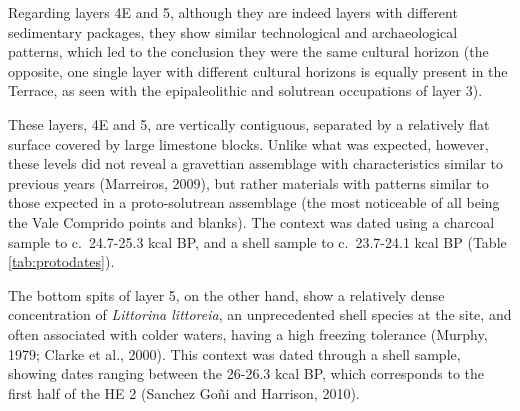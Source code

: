 \documentclass[12pt,twoside]{reedthesis}
\begin{document}
Regarding layers 4E and 5, although they are indeed layers with different sedimentary packages, they show similar technological and archaeological patterns, which led to the conclusion they were the same cultural horizon (the opposite, one single layer with different cultural horizons is equally present in the Terrace, as seen with the epipaleolithic and solutrean occupations of layer 3).

These layers, 4E and 5, are vertically contiguous, separated by a relatively flat surface covered by large limestone blocks. Unlike what was expected, however, these levels did not reveal a gravettian assemblage with characteristics similar to previous years (Marreiros, 2009), but rather materials with patterns similar to those expected in a proto-solutrean assemblage (the most noticeable of all being the Vale Comprido points and blanks). The context was dated using a charcoal sample to c.~24.7-25.3 kcal BP, and a shell sample to c.~23.7-24.1 kcal BP (Table \ref{tab:protodates}).

The bottom spits of layer 5, on the other hand, show a relatively dense concentration of \emph{Littorina littoreia}, an unprecedented shell species at the site, and often associated with colder waters, having a high freezing tolerance (Murphy, 1979; Clarke et al., 2000). This context was dated through a shell sample, showing dates ranging between the 26-26.3 kcal BP, which corresponds to the first half of the HE 2 (Sanchez Goñi and Harrison, 2010).
\end{document}
